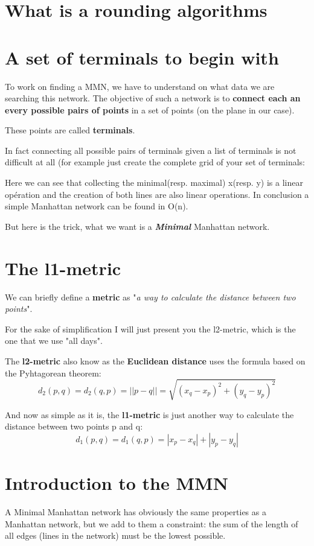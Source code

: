 \section{What is a rounding algorithms}%



\section{A set of terminals to begin with}%
To work on finding a MMN, we have to understand on what data we are searching this network. The objective of such a network is to \textbf{connect each an every possible pairs of points} in a set of points (on the plane in our case).

These points are called \textbf{terminals}.

In fact connecting all possible pairs of terminals given a list of terminals is not difficult at all (for example just create the complete grid of your set of terminals: 



Here we can see that collecting the minimal(resp. maximal) x(resp. y) is a linear opération and the creation of both lines are also linear operations. In conclusion a simple Manhattan network can be found in O(n).

But here is the trick, what we want is a \textbf{\emph{Minimal}} Manhattan network.

\section{The l1-metric}%
We can briefly define  a \textbf{metric} as "\emph{a way to calculate the distance between two points}".

For the sake of simplification I will just present you the l2-metric, which is the one that we use "all days".

The \textbf{l2-metric} also know as the \textbf{Euclidean distance} uses the formula based on the Pyhtagorean theorem:
	\[d_2(p,q)= d_2(q,p) = ||p - q|| = \sqrt{(x_q-x_p)^2+(y_q-y_p)^2}\]
	
And now as simple as it is, the \textbf{l1-metric} is just another way to calculate the distance between two points p and q:
	\[ d_{1}(p,q)= d_{1}(q,p) = |x_p-x_q|+|y_p-y_q|\]

\section{Introduction to the MMN}%
A Minimal Manhattan network has obviously the same properties as a Manhattan network, but we add to them a constraint: the sum of the length of all edges (lines in the network) must be the lowest possible.

